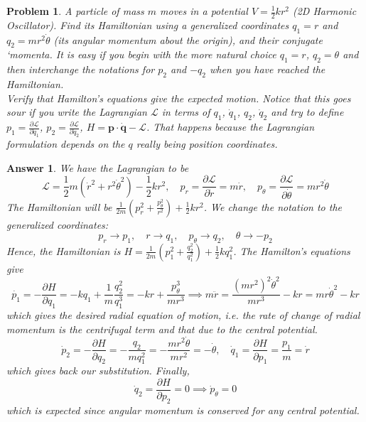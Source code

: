 \documentclass[a4paper]{article}
\newtheorem{ans}{Answer}[section]
\theoremstyle{new}
\newtheorem{qns}{Problem}[section]
\begin{document}
\newpage
\begin{qns}
A particle of mass $m$ moves in a potential $V=\frac{1}{2}kr^2$ (2D Harmonic Oscillator). Find its Hamiltonian using a generalized coordinates $q_1=r$ and $q_2=mr^2\dot{\theta}$ (its angular momentum about the origin), and their conjugate `momenta. It is easy if you begin with the more natural choice $q_1=r$, $q_2=\theta$ and then interchange the notations for $p_2$ and $-q_2$ when you have reached the Hamiltonian.\\[5pt]
Verify that Hamilton's equations give the expected motion. Notice that this goes sour if you write the Lagrangian $\mathcal{L}$ in terms of $q_1$, $\dot{q}_1$, $q_2$, $\dot{q}_2$ and try to define $p_1=\frac{\partial\mathcal{L}}{\partial\dot{q}_1}$, $p_2=\frac{\partial\mathcal{L}}{\partial\dot{q}_2}$, $H=\mathbf{p}\cdot\mathbf{\dot{q}}-\mathcal{L}$. That happens because the Lagrangian formulation depends on the $q$ really being position coordinates.
\end{qns}
\begin{ans}
We have the Lagrangian to be
$$\mathcal{L}=\frac{1}{2}m(\dot{r}^2+r^2\dot{\theta}^2)-\frac{1}{2}kr^2,\quad p_r=\frac{\partial\mathcal{L}}{\partial\dot{r}}=m\dot{r},\quad p_\theta=\frac{\partial\mathcal{L}}{\partial\dot{\theta}}=mr^2\dot{\theta}$$
The Hamiltonian will be $\frac{1}{2m}(p_r^2+\frac{p_\theta^2}{r^2})+\frac{1}{2}kr^2$. We change the notation to the generalized coordinates:
$$p_r\rightarrow p_1,\quad r\rightarrow q_1,\quad p_\theta\rightarrow q_2,\quad\theta\rightarrow -p_2$$
Hence, the Hamiltonian is $H=\frac{1}{2m}(p_1^2+\frac{q_2^2}{q_1^2})+\frac{1}{2}kq_1^2$. The Hamilton's equations give
$$\dot{p_1}=-\frac{\partial H}{\partial q_1}=-kq_1+\frac{1}{m}\frac{q_2^2}{q_1^3}=-kr+\frac{p_\theta^3}{mr^3}\implies m\ddot{r}=\frac{(mr^2)^2\dot{\theta}^2}{mr^3}-kr=mr\dot{\theta}^2-kr$$
which gives the desired radial equation of motion, i.e. the rate of change of radial momentum is the centrifugal term and that due to the central potential.
$$\dot{p}_2=-\frac{\partial H}{\partial q_2}=-\frac{q_2}{mq_1^2}=-\frac{mr^2\dot{\theta}}{mr^2}=-\dot{\theta},\quad\dot{q}_1=\frac{\partial H}{\partial p_1}=\frac{p_1}{m}=\dot{r}$$
which gives back our substitution. Finally,
$$\dot{q}_2=\frac{\partial H}{\partial p_2}=0\implies\dot{p}_\theta=0$$
which is expected since angular momentum is conserved for any central potential.
\end{ans}
\end{document}

